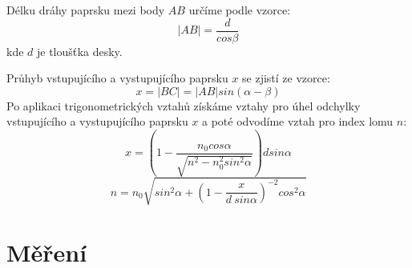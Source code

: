 \documentclass[a4paper,11pt]{article}
\begin{document}
    \begin{minipage}[t]{0.5\textwidth} 
            Délku dráhy paprsku mezi body $AB$ určíme podle vzorce:
            \begin{equation}
                \vert AB\vert = \frac{d}{cos\beta}
            \end{equation}
            kde $d$ je tloušťka desky.
            \par Průhyb vstupujícího a vystupujícího paprsku $x$ se zjistí ze vzorce: 
            \begin{equation}
                x = \vert BC\vert = \vert AB\vert sin(\alpha - \beta)
            \end{equation}
            Po aplikaci trigonometrických vztahů získáme vztahy pro úhel odchylky vstupujícího a vystupujícího paprsku $x$ a poté odvodíme vztah pro index lomu $n$:
            \begin{equation}
                x = \left( 1 - \frac{n_0 cos \alpha}{\sqrt{n^2 - n_0^2 sin^2 \alpha}} \right)dsin \alpha
            \end{equation}
            \begin{equation}
                n = n_0 \sqrt{sin^2 \alpha + \left( 1- \frac{x}{d~sin \alpha}\right)^{-2} cos^2 \alpha}
            \end{equation}
    \section{Měření}  

\end{minipage}
\end{document}
